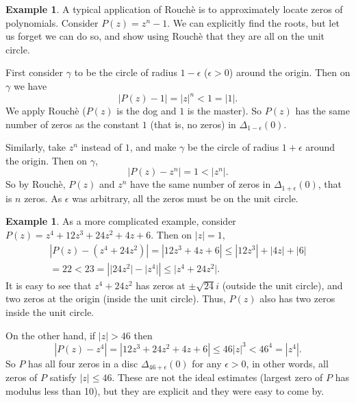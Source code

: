 \documentclass[12pt,openany]{book}
\newcommand{\sabs}[1]{\lvert {#1} \rvert}
\newcommand{\abs}[1]{\left\lvert {#1} \right\rvert}
\theoremstyle{plain}
\theoremstyle{remark}
\theoremstyle{definition}
\theoremstyle{exercise}
\theoremstyle{example}
\newtheorem{example}[thm]{Example}
\begin{document}
\begin{example}
A typical application of Rouch\`e is to approximately locate zeros of
polynomials.  Consider $P(z) = z^n - 1$.  We can explicitly find the roots,
but let us forget we can do so,
and show using Rouch\`e that they are all on the unit circle.

First
consider $\gamma$ to be the circle of radius $1-\epsilon$ ($\epsilon > 0$)
around the origin.  Then on $\gamma$ we have
\begin{equation*}
\abs{P(z) - 1} = \abs{z}^n < 1 = \sabs{1}.
\end{equation*}
We apply Rouch\`e ($P(z)$ is the dog and $1$ is the master).  So $P(z)$
has the same number of zeros as the constant $1$ (that is, no zeros) in
$\Delta_{1-\epsilon}(0)$.

Similarly, take $z^n$ instead of $1$, and make $\gamma$ be the circle of
radius $1+\epsilon$ around the origin.  Then on $\gamma$,
\begin{equation*}
\abs{P(z) - z^n} = 1 < \abs{z^n} .
\end{equation*}
So by Rouch\`e, $P(z)$ and $z^n$ have the same number of zeros in
$\Delta_{1+\epsilon}(0)$, that is $n$ zeros.  As $\epsilon$ was arbitrary,
all the zeros must be on the unit circle.
\end{example}

\begin{example}
As a more complicated example, consider $P(z) = z^4+12z^3+24z^2+4z+6$.
Then on $\sabs{z}=1$,
\begin{multline*}
\abs{P(z)-(z^4+24z^2)} =
\abs{12z^3+4z+6} \leq
\abs{12z^3}+\abs{4z}+\abs{6} \\
= 22 < 23 = \abs{\sabs{24 z^2} - \sabs{z^4}}
\leq \sabs{z^4+24z^2} .
\end{multline*}
It is easy to see that $z^4+24z^2$ has zeros at $\pm \sqrt{24} i$ (outside
the unit circle), and two zeros at the origin (inside the unit circle).
Thus, $P(z)$ also has two zeros inside the unit circle.

On the other hand, if $\sabs{z} > 46$ then
\begin{equation*}
\abs{P(z)-z^4} = \abs{12z^3+24z^2+4z+6}
\leq 46 \sabs{z}^3 < 46^4 = \abs{z^4}.
\end{equation*}
So $P$ has all four zeros in a disc $\Delta_{46+\epsilon}(0)$ for any
$\epsilon > 0$,
in other words, all zeros of $P$ satisfy $\sabs{z} \leq 46$.
These are not the ideal estimates (largest zero of $P$ has modulus less than
10), but they are explicit and they were easy to come by.
\end{example}
\end{document}
